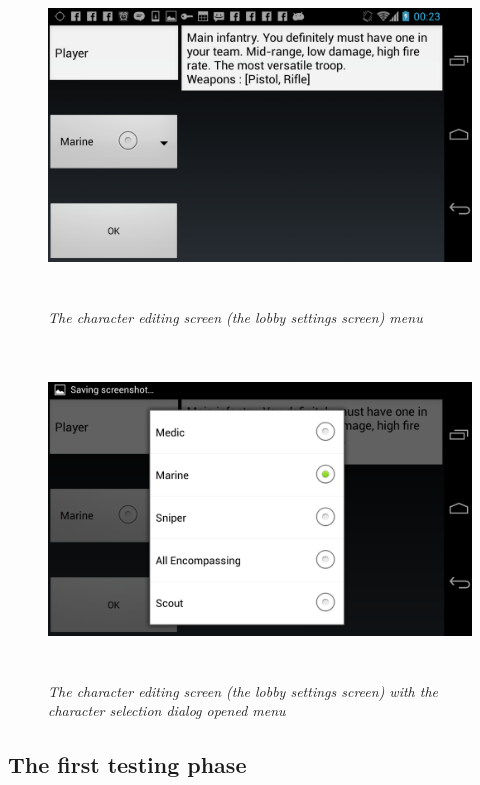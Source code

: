 \begin{figure}
\includegraphics[height=3.5in,width=6.23in]{./images/android_screenshots/first_development/game_first_development_9.png}
\caption{\small \sl The character editing screen (the lobby settings screen)
menu\label{fig:lobby_settings_1}}
\end{figure}

\begin{figure}
\includegraphics[height=3.5in,width=6.23in]{./images/android_screenshots/first_development/game_first_development_10.png}
\caption{\small \sl The character editing screen (the lobby settings screen)
with the character selection dialog opened menu\label{fig:lobby_settings_2}}
\end{figure}


\subsection{The first testing phase}

